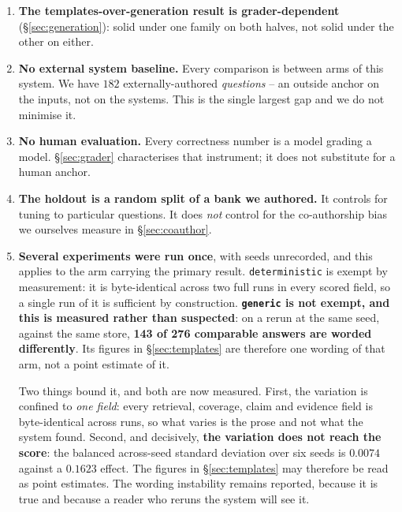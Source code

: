 \documentclass{article}
\newcommand{\expref}[1]{\iftoggle{trace}{\,{\scriptsize\textcolor{gray}{\texttt{[#1]}}}}{}}
\begin{document}
\begin{enumerate}
\item \textbf{The templates-over-generation result is grader-dependent}
      (\S\ref{sec:generation}): solid under one family on both halves, not solid
      under the other on either.
\item \textbf{No external system baseline.} Every comparison is between arms of
      this system. We have $182$ externally-authored \emph{questions} -- an
      outside anchor on the inputs, not on the systems. This is the single
      largest gap and we do not minimise it.
\item \textbf{No human evaluation.} Every correctness number is a model grading a
      model. \S\ref{sec:grader} characterises that instrument; it does not
      substitute for a human anchor.
\item \textbf{The holdout is a random split of a bank we authored.} It controls
      for tuning to particular questions. It does \emph{not} control for the
      co-authorship bias we ourselves measure in \S\ref{sec:coauthor}.
\item \textbf{Several experiments were run once}, with seeds unrecorded, and this
      applies to the arm carrying the primary result. \texttt{deterministic} is
      exempt by measurement: it is byte-identical across two full runs in every
      scored field, so a single run of it is sufficient by
      construction.\expref{EXP-2026-09-010} \textbf{\texttt{generic} is not
      exempt, and this is measured rather than suspected}: on a rerun at the same
      seed, against the same store, \textbf{143 of 276 comparable answers are
      worded differently}.\expref{EXP-2026-09-010} Its figures in
      \S\ref{sec:templates} are therefore one wording of that arm, not a point
      estimate of it.

      Two things bound it, and both are now measured. First, the variation is
      confined to \emph{one field}: every retrieval, coverage, claim and evidence
      field is byte-identical across runs, so what varies is the prose and not
      what the system found. Second, and decisively, \textbf{the variation does
      not reach the score}: the balanced across-seed standard deviation over six
      seeds is $0.0074$ against a $0.1623$ effect.\expref{EXP-2026-09-011} The figures in
      \S\ref{sec:templates} may therefore be read as point estimates. The
      wording instability remains reported, because it is true and because a
      reader who reruns the system will see it.


\end{enumerate}
\end{document}
